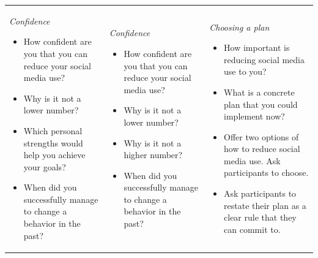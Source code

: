 \begin{tabularx}{\textwidth}{
  >{\raggedright\arraybackslash}X
  >{\raggedright\arraybackslash}X
  >{\raggedright\arraybackslash}X}
\begin{minipage}[t]{\linewidth}\vspace{0pt}
\textit{Confidence}
\begin{itemize}[leftmargin=*,nosep]
\item How confident are you that you can reduce your social media use?
\item Why is it not a lower number?
\item Which personal strengths would help you achieve your goals?
\item When did you successfully manage to change a behavior in the past?
\end{itemize}
\end{minipage}
\vspace{-0.5em}
&
\vspace{-0.5em}

\begin{minipage}[t]{\linewidth}\vspace{0pt}
\textit{Confidence}
\begin{itemize}[leftmargin=*,nosep]
\item How confident are you that you can reduce your social media use?
\item Why is it not a lower number?
\item Why is it not a higher number?
\item When did you successfully manage to change a behavior in the past?
\end{itemize}
\end{minipage}
\vspace{-0.5em}
& 
\vspace{-0.5em}

\begin{minipage}[t]{\linewidth}\vspace{0pt}
\textit{Choosing a plan}
\begin{itemize}[leftmargin=*,nosep]
\item How important is reducing social media use to you?
\item What is a concrete plan that you could implement now?
\item Offer two options of how to reduce social media use. Ask participants to choose.
\item Ask participants to restate their plan as a clear rule that they can commit to.
\end{itemize}
\end{minipage}
\vspace{-0.5em}
\\


\end{tabularx}
